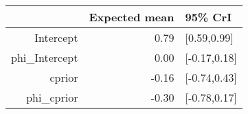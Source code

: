 \begin{tabular}{rrl}
  \hline
 & Expected mean & 95\% CrI \\ 
  \hline
Intercept & 0.79 & [0.59,0.99] \\ 
  phi\_Intercept & 0.00 & [-0.17,0.18] \\ 
  cprior & -0.16 & [-0.74,0.43] \\ 
  phi\_cprior & -0.30 & [-0.78,0.17] \\ 
   \hline
\end{tabular}

